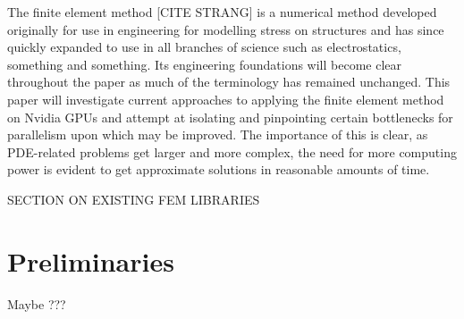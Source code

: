 The finite element method [CITE STRANG] is a numerical method developed originally for use in engineering for modelling stress on structures and has since quickly expanded to use in all branches of science such as electrostatics, something and something. Its engineering foundations will become clear throughout the paper as much of the terminology has remained unchanged. This paper will investigate current approaches to applying the finite element method on Nvidia GPUs and attempt at isolating and pinpointing certain bottlenecks for parallelism upon which may be improved. The importance of this is clear, as PDE-related problems get larger and more complex, the  need for more computing power is evident to get approximate solutions in reasonable amounts of time.

SECTION ON EXISTING FEM LIBRARIES 

\section{Preliminaries}
Maybe ???